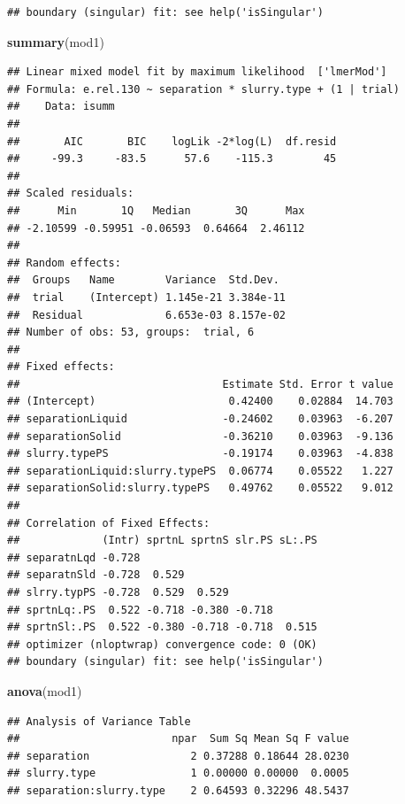 \documentclass[
]{article}
\newenvironment{Shaded}{\begin{snugshade}}{\end{snugshade}}
\newcommand{\FunctionTok}[1]{\textcolor[rgb]{0.13,0.29,0.53}{\textbf{#1}}}
\newcommand{\NormalTok}[1]{#1}
\begin{document}
\begin{verbatim}
## boundary (singular) fit: see help('isSingular')
\end{verbatim}

\begin{Shaded}
\begin{Highlighting}[]
\FunctionTok{summary}\NormalTok{(mod1)}
\end{Highlighting}
\end{Shaded}

\begin{verbatim}
## Linear mixed model fit by maximum likelihood  ['lmerMod']
## Formula: e.rel.130 ~ separation * slurry.type + (1 | trial)
##    Data: isumm
## 
##       AIC       BIC    logLik -2*log(L)  df.resid 
##     -99.3     -83.5      57.6    -115.3        45 
## 
## Scaled residuals: 
##      Min       1Q   Median       3Q      Max 
## -2.10599 -0.59951 -0.06593  0.64664  2.46112 
## 
## Random effects:
##  Groups   Name        Variance  Std.Dev. 
##  trial    (Intercept) 1.145e-21 3.384e-11
##  Residual             6.653e-03 8.157e-02
## Number of obs: 53, groups:  trial, 6
## 
## Fixed effects:
##                                Estimate Std. Error t value
## (Intercept)                     0.42400    0.02884  14.703
## separationLiquid               -0.24602    0.03963  -6.207
## separationSolid                -0.36210    0.03963  -9.136
## slurry.typePS                  -0.19174    0.03963  -4.838
## separationLiquid:slurry.typePS  0.06774    0.05522   1.227
## separationSolid:slurry.typePS   0.49762    0.05522   9.012
## 
## Correlation of Fixed Effects:
##             (Intr) sprtnL sprtnS slr.PS sL:.PS
## separatnLqd -0.728                            
## separatnSld -0.728  0.529                     
## slrry.typPS -0.728  0.529  0.529              
## sprtnLq:.PS  0.522 -0.718 -0.380 -0.718       
## sprtnSl:.PS  0.522 -0.380 -0.718 -0.718  0.515
## optimizer (nloptwrap) convergence code: 0 (OK)
## boundary (singular) fit: see help('isSingular')
\end{verbatim}

\begin{Shaded}
\begin{Highlighting}[]
\FunctionTok{anova}\NormalTok{(mod1)}
\end{Highlighting}
\end{Shaded}

\begin{verbatim}
## Analysis of Variance Table
##                        npar  Sum Sq Mean Sq F value
## separation                2 0.37288 0.18644 28.0230
## slurry.type               1 0.00000 0.00000  0.0005
## separation:slurry.type    2 0.64593 0.32296 48.5437
\end{verbatim}
\end{document}
